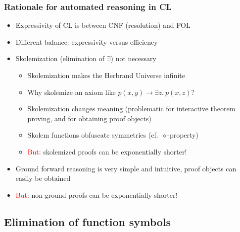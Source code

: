 \documentclass[handout,11pt]{beamer}
\newcommand{\red}[1]{\textcolor{red}{#1}}
\begin{document}
\begin{frame}
\frametitle{Rationale for automated reasoning in CL}
 \begin{itemize}[<+->] %
    \item Expressivity of CL is between CNF (resolution) and FOL
    \item Different balance: expressivity versus efficiency
    \item Skolemization (elimination of $\exists$) not necessary
    \begin{itemize}
       \item Skolemization makes the Herbrand Universe infinite
       \item Why skolemize an axiom like $p(x,y)\to\exists z.~p(x,z)$?
       \item Skolemization changes meaning (problematic for interactive
       theorem proving, and for obtaining proof objects)
       \item Skolem functions obfuscate symmetries (cf.\ $\diamond$-property)
       \item \red{But}: skolemized proofs can be exponentially shorter!
    \end{itemize}
   \item Ground forward reasoning is very simple and intuitive,
   proof objects can easily be obtained
   \item \red{But}: non-ground proofs can be exponentially shorter!   
 \end{itemize}
\end{frame}



 
\subsection{Elimination of function symbols}
\end{document}

